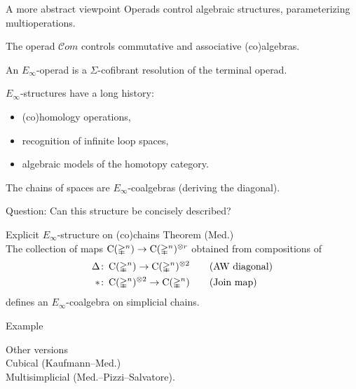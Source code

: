 \begin{frame}{A more abstract viewpoint}
	\pause
	Operads control algebraic structures, parameterizing multioperations.

	\bigskip\pause
	The operad $\mathcal{C}om$ controls commutative and associative (co)algebras.

	\bigskip\pause
	An $E_\infty$-operad is a $\Sigma$-cofibrant resolution of the terminal operad.

	\bigskip\pause
	$E_\infty$-structures have a long history:
	\smallskip\pause
	\begin{itemize}
		\item (co)homology operations,
		\item recognition of infinite loop spaces,
		\item algebraic models of the homotopy category.
	\end{itemize}

	\bigskip\pause
	The chains of spaces are $E_\infty$-coalgebras (deriving the diagonal).

	\bigskip\pause
	\textcolor{pblue}{Question}: Can this structure be concisely described?
\end{frame}

\begin{frame}{Explicit $E_\infty$-structure on (co)chains}
	\pause
	\textcolor{pblue}{Theorem (Med.)} \\
	The collection of maps $\operatorname{C}(\mathbb{\Delta}^n) \to \operatorname{C}(\mathbb{\Delta}^n)^{\otimes r}$ obtained from compositions of
	\begin{align*}
		\Delta &\colon \operatorname{C}(\mathbb{\Delta}^n) \to \operatorname{C}(\mathbb{\Delta}^n)^{\otimes 2}
		\qquad \text{(AW diagonal)} \\
		\ast &\colon \operatorname{C}(\mathbb{\Delta}^n)^{\otimes 2} \to \operatorname{C}(\mathbb{\Delta}^n)
		\qquad \text{(Join map)}
	\end{align*}
	defines an $E_\infty$-coalgebra on simplicial chains.

	\bigskip\pause
	\textcolor{pblue}{Example} \\
	\qquad\qquad \scalebox{0.7}{}

	\bigskip\pause
	\textcolor{pblue}{Other versions} \\
	Cubical (Kaufmann--Med.) \\
	Multisimplicial (Med.--Pizzi--Salvatore).
\end{frame}

